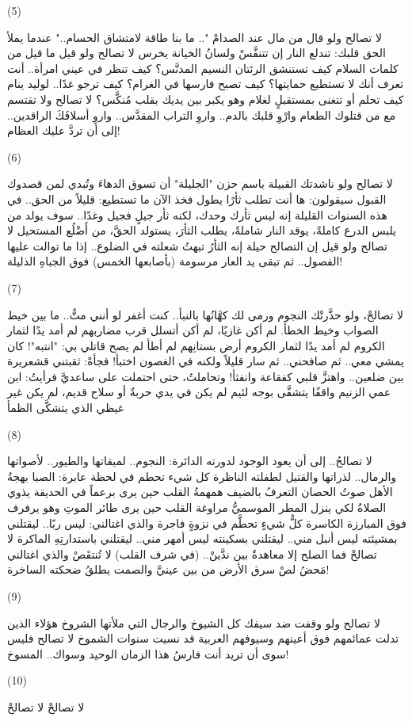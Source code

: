 \documentclass{article}
\begin{document}
\begin{modernpoem*}
(\textenglish{5})

لا تصالح
ولو قال من مال عند الصدامْ
".. ما بنا طاقة لامتشاق الحسام.."
عندما يملأ الحق قلبك:
تندلع النار إن تتنفَّسْ
ولسانُ الخيانة يخرس
لا تصالح
ولو قيل ما قيل من كلمات السلام
كيف تستنشق الرئتان النسيم المدنَّس؟
كيف تنظر في عيني امرأة..
أنت تعرف أنك لا تستطيع حمايتها؟
كيف تصبح فارسها في الغرام؟
كيف ترجو غدًا.. لوليد ينام
كيف تحلم أو تتغنى بمستقبلٍ لغلام
وهو يكبر بين يديك بقلب مُنكَّس؟
لا تصالح
ولا تقتسم مع من قتلوك الطعام
وارْوِ قلبك بالدم..
واروِ التراب المقدَّس..
واروِ أسلافَكَ الراقدين..
إلى أن تردَّ عليك العظام!

(\textenglish{6})

لا تصالح
ولو ناشدتك القبيلة
باسم حزن "الجليلة"
أن تسوق الدهاءَ
وتُبدي لمن قصدوك القبول
سيقولون:
ها أنت تطلب ثأرًا يطول
فخذ الآن ما تستطيع:
قليلاً من الحق..
في هذه السنوات القليلة
إنه ليس ثأرك وحدك،
لكنه ثأر جيلٍ فجيل
وغدًا..
سوف يولد من يلبس الدرع كاملةً،
يوقد النار شاملةً،
يطلب الثأرَ،
يستولد الحقَّ،
من أَضْلُع المستحيل
لا تصالح
ولو قيل إن التصالح حيلة
إنه الثأرُ
تبهتُ شعلته في الضلوع..
إذا ما توالت عليها الفصول..
ثم تبقى يد العار مرسومة (بأصابعها الخمس)
فوق الجباهِ الذليلة!

(\textenglish{7})

لا تصالحْ، ولو حذَّرتْك النجوم
ورمى لك كهَّانُها بالنبأ..
كنت أغفر لو أنني متُّ..
ما بين خيط الصواب وخيط الخطأ.
لم أكن غازيًا،
لم أكن أتسلل قرب مضاربهم
لم أمد يدًا لثمار الكروم
لم أمد يدًا لثمار الكروم
أرض بستانِهم لم أطأ
لم يصح قاتلي بي: "انتبه"!
كان يمشي معي..
ثم صافحني..
ثم سار قليلاً
ولكنه في الغصون اختبأ!
فجأةً:
ثقبتني قشعريرة بين ضلعين..
واهتزَّ قلبي كفقاعة وانفثأ!
وتحاملتُ، حتى احتملت على ساعديَّ
فرأيتُ: ابن عمي الزنيم
واقفًا يتشفَّى بوجه لئيم
لم يكن في يدي حربةٌ
أو سلاح قديم،
لم يكن غير غيظي الذي يتشكَّى الظمأ

(\textenglish{8})

لا تصالحُ..
إلى أن يعود الوجود لدورته الدائرة:
النجوم.. لميقاتها
والطيور.. لأصواتها
والرمال.. لذراتها
والقتيل لطفلته الناظرة
كل شيء تحطم في لحظة عابرة:
الصبا بهجةُ الأهل صوتُ الحصان التعرفُ بالضيف همهمةُ القلب
حين يرى برعماً في الحديقة يذوي الصلاةُ لكي ينزل المطر الموسميُّ مراوغة القلب حين يرى طائر الموتِ
وهو يرفرف فوق المبارزة الكاسرة
كلُّ شيءٍ تحطَّم في نزوةٍ فاجرة
والذي اغتالني: ليس ربًا..
ليقتلني بمشيئته
ليس أنبل مني.. ليقتلني بسكينته
ليس أمهر مني.. ليقتلني باستدارتِهِ الماكرة
لا تصالحْ
فما الصلح إلا معاهدةٌ بين ندَّينْ..
(في شرف القلب)
لا تُنتقَصْ
والذي اغتالني مَحضُ لصْ
سرق الأرض من بين عينيَّ
والصمت يطلقُ ضحكته الساخرة!

(\textenglish{9})

لا تصالح
ولو وقفت ضد سيفك كل الشيوخ
والرجال التي ملأتها الشروخ
هؤلاء الذين تدلت عمائمهم فوق أعينهم
وسيوفهم العربية قد نسيت سنوات الشموخ
لا تصالح
فليس سوى أن تريد
أنت فارسُ هذا الزمان الوحيد
وسواك.. المسوخ!

(\textenglish{10})

لا تصالحْ
لا تصالحْ
\end{modernpoem*}
\end{document}

